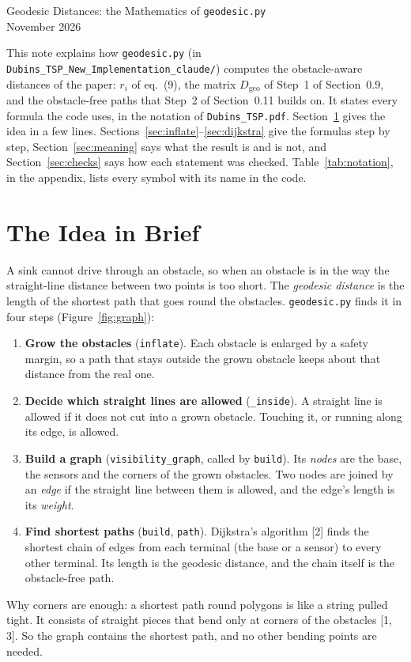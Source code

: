 \documentclass[10pt]{article}
\newcommand{\code}[1]{\texttt{#1}}
\begin{document}
\begin{center}
  {\LARGE Geodesic Distances: the Mathematics of \code{geodesic.py}}\\[1.2em]
  {\large November 2026}
\end{center}
\vspace{1em}

{\sloppy
This note explains how \code{geodesic.py} (in \code{Dubins\_TSP\_New\_Implementation\_claude/}) computes the
obstacle-aware distances of the paper: $r_i$ of eq.~(9), the matrix $D_{\mathrm{geo}}$ of Step~1 of Section~0.9, and
the obstacle-free paths that Step~2 of Section~0.11 builds on. It states every formula the code uses, in the notation of
\code{Dubins\_TSP.pdf}. Section~\ref{sec:idea} gives the idea in a few lines. Sections~\ref{sec:inflate}--\ref{sec:dijkstra}
give the formulas step by step, Section~\ref{sec:meaning} says what the result is and is not, and
Section~\ref{sec:checks} says how each statement was checked. Table~\ref{tab:notation}, in the appendix, lists every
symbol with its name in the code.\par}

\section{The Idea in Brief}
\label{sec:idea}

A sink cannot drive through an obstacle, so when an obstacle is in the way the straight-line distance between two
points is too short. The \emph{geodesic distance} is the length of the shortest path that goes round the obstacles.
\code{geodesic.py} finds it in four steps (Figure~\ref{fig:graph}):
\begin{enumerate}[leftmargin=2em, itemsep=2pt]
  \item \textbf{Grow the obstacles} (\code{inflate}). Each obstacle is enlarged by a safety margin, so a path that stays
        outside the grown obstacle keeps about that distance from the real one.
  \item \textbf{Decide which straight lines are allowed} (\code{\_inside}). A straight line is allowed if it does not cut
        into a grown obstacle. Touching it, or running along its edge, is allowed.
  \item \textbf{Build a graph} (\code{visibility\_graph}, called by \code{build}). Its \emph{nodes} are the base, the sensors and the corners of the grown
        obstacles. Two nodes are joined by an \emph{edge} if the straight line between them is allowed, and the edge's
        length is its \emph{weight}.
  \item \textbf{Find shortest paths} (\code{build}, \code{path}). Dijkstra's algorithm [2] finds the shortest chain of
        edges from each terminal (the base or a sensor) to every other terminal. Its length is the geodesic distance, and the chain
        itself is the obstacle-free path.
\end{enumerate}
Why corners are enough: a shortest path round polygons is like a string pulled tight. It consists of straight pieces
that bend only at corners of the obstacles [1, 3]. So the graph contains the shortest path, and no other bending points
are needed.
\end{document}
